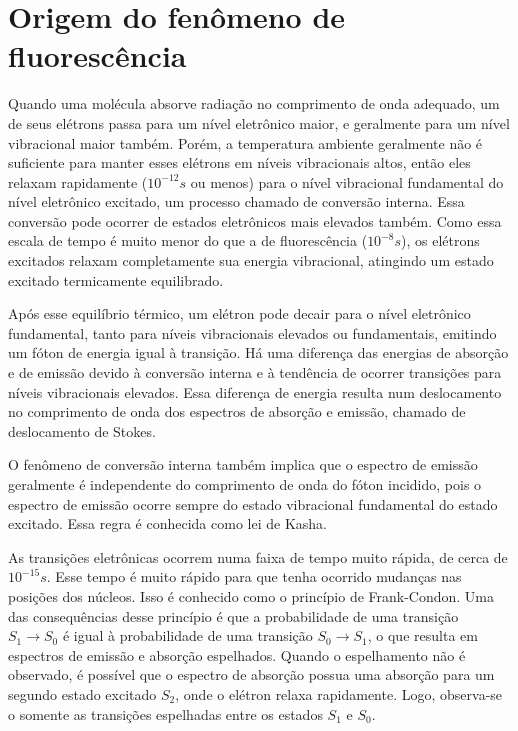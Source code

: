 		\section{Origem do fenômeno de fluorescência}
		
		Quando uma molécula absorve radiação no comprimento de onda adequado, um de seus elétrons passa para um nível eletrônico maior, e geralmente para um nível vibracional maior também. Porém, a temperatura ambiente geralmente não é suficiente para manter esses elétrons em níveis vibracionais altos, então eles relaxam rapidamente (\(10^{-12} s\) ou menos) para o nível vibracional fundamental do nível eletrônico excitado, um processo chamado de conversão interna. Essa conversão pode ocorrer de estados eletrônicos mais elevados também. Como essa escala de tempo é muito menor do que a de fluorescência (\(10^{-8} s\)), os elétrons excitados relaxam completamente sua energia vibracional, atingindo um estado excitado termicamente equilibrado.
		
		Após esse equilíbrio térmico, um elétron pode decair para o nível eletrônico fundamental, tanto para níveis vibracionais elevados ou fundamentais, emitindo um fóton de energia igual à transição. Há uma diferença das energias de absorção e de emissão devido à conversão interna e à tendência de ocorrer transições para níveis vibracionais elevados. Essa diferença de energia resulta num deslocamento no comprimento de onda dos espectros de absorção e emissão, chamado de deslocamento de Stokes.
		
		O fenômeno de conversão interna também implica que o espectro de emissão geralmente é independente do comprimento de onda do fóton incidido, pois o espectro de emissão ocorre sempre do estado vibracional fundamental do estado excitado. Essa regra é conhecida como lei de Kasha.
		
		As transições eletrônicas ocorrem numa faixa de tempo muito rápida, de cerca de \(10^{-15} s\). Esse tempo é muito rápido para que tenha ocorrido mudanças nas posições dos núcleos. Isso é conhecido como o princípio de Frank-Condon. Uma das consequências desse princípio é que a probabilidade de uma transição \(S_1 \to S_0\) é igual à probabilidade de uma transição \(S_0 \to S_1\), o que resulta em espectros de emissão e absorção espelhados. Quando o espelhamento não é observado, é possível que o espectro de absorção possua uma absorção para um segundo estado excitado \(S_2\), onde o elétron relaxa rapidamente. Logo, observa-se o somente as transições espelhadas entre os estados \(S_1\) e \(S_0\).
			
